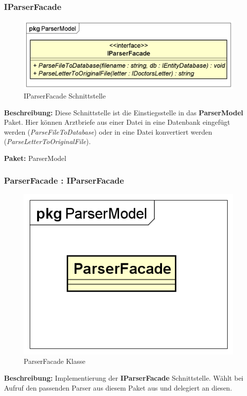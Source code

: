 \documentclass[a4paper]{scrreprt}
\begin{document}
\subsubsection{IParserFacade}
\begin{figure}[H]
\centering
\includegraphics[width=0.75\textheight]{graphics/Klassendiagramme/Model/IParserFacade.png}
\caption{IParserFacade Schnittstelle}
\end{figure}
\textbf{Beschreibung:} Diese Schnittstelle ist die Einstiegsstelle in das \textbf{ParserModel} Paket. 
Hier können Arztbriefe aus einer Datei in eine Datenbank eingefügt werden (\textit{ParseFileToDatabase}) oder in eine Datei konvertiert werden (\textit{ParseLetterToOriginalFile}).

\textbf{Paket:} ParserModel

\subsubsection{ParserFacade : IParserFacade}
\begin{figure}[H]
\centering
\includegraphics[width=0.75\textheight]{graphics/Klassendiagramme/Model/ParserFacade.png}
\caption{ParserFacade Klasse}
\end{figure}
\textbf{Beschreibung:} Implementierung der \textbf{IParserFacade} Schnittstelle. Wählt bei Aufruf den passenden Parser aus diesem Paket aus und delegiert an diesen.
\end{document}

